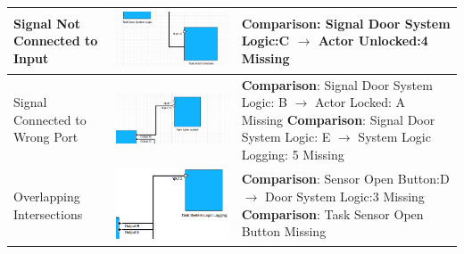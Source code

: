 \begin{longtable}{p{} >{\raggedright\arraybackslash}m{} >{\raggedright\arraybackslash}m{}}
    \midrule
    Signal Not Connected to Input & \includegraphics[width=\linewidth]{pictures/80_signal_not_connected_to_input_input_clip.png} & \textbf{Comparison}: Signal Door System Logic:C $\rightarrow$ Actor Unlocked:4 Missing \\
    \midrule
    Signal Connected to Wrong Port & \includegraphics[width=\linewidth]{pictures/81_signal_wrong_port_correct_task_input_clip.png} & \textbf{Comparison}: Signal Door System Logic: B $\rightarrow$ Actor Locked: A Missing \newline \textbf{Comparison}: Signal Door System Logic: E $\rightarrow$ System Logic Logging: 5 Missing \\
    \midrule
    Overlapping Intersections & \includegraphics[width=\linewidth]{pictures/92_modified_task_name_input_clip.png} & \textbf{Comparison}: Sensor Open Button:D $\rightarrow$ Door System Logic:3 Missing \newline \textbf{Comparison}: Task Sensor Open Button Missing \\

\end{longtable}
